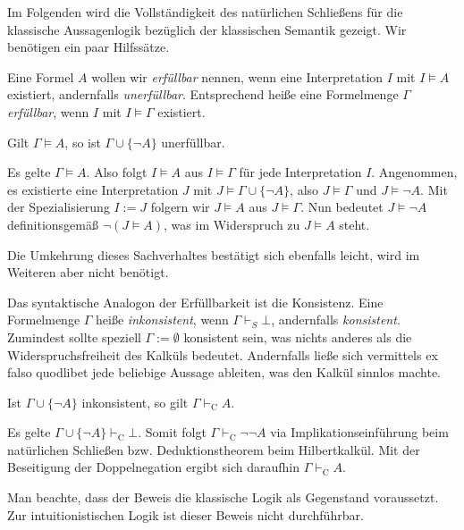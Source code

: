 Im Folgenden wird die Vollständigkeit des natürlichen Schließens für
die klassische Aussagenlogik bezüglich der klassischen Semantik gezeigt.
Wir benötigen ein paar Hilfssätze.

Eine Formel $A$ wollen wir \emph{erfüllbar} nennen, wenn eine
Interpretation $I$ mit $I\models A$ existiert, andernfalls
\emph{unerfüllbar}. Entsprechend heiße eine Formelmenge $\Gamma$
\emph{erfüllbar}, wenn $I$ mit $I\models\Gamma$ existiert.

\begin{Satz}\label{gueltig-unerf}
Gilt $\Gamma\models A$, so ist $\Gamma\cup\{\lnot A\}$ unerfüllbar.
\end{Satz}
\begin{Beweis}
Es gelte $\Gamma\models A$. Also folgt $I\models A$ aus $I\models\Gamma$
für jede Interpretation $I$. Angenommen, es existierte eine
Interpretation $J$ mit $J\models\Gamma\cup\{\lnot A\}$, also
$J\models\Gamma$ und $J\models\lnot A$. Mit der Spezialisierung $I:=J$
folgern wir $J\models A$ aus $J\models\Gamma$. Nun bedeutet
$J\models\lnot A$ definitionsgemäß $\lnot(J\models A)$, was im
Widerspruch zu $J\models A$ steht.\,\qedsymbol
\end{Beweis}

\noindent
Die Umkehrung dieses Sachverhaltes bestätigt sich ebenfalls leicht,
wird im Weiteren aber nicht benötigt.

Das syntaktische Analogon der Erfüllbarkeit ist die Konsistenz.
Eine Formelmenge $\Gamma$ heiße \emph{inkonsistent}, wenn
$\Gamma\vdash_S\bot$, andernfalls \emph{konsistent}. Zumindest sollte
speziell $\Gamma:=\emptyset$ konsistent sein, was nichts anderes als die
Widerspruchsfreiheit des Kalküls bedeutet. Andernfalls ließe sich
vermittels ex falso quodlibet jede beliebige Aussage ableiten, was den
Kalkül sinnlos machte.

\begin{Satz}\label{inkon-ableitbar}
Ist $\Gamma\cup\{\lnot A\}$ inkonsistent, so gilt $\Gamma\vdash_{\mathrm C} A$.
\end{Satz}
\begin{Beweis}
Es gelte $\Gamma\cup\{\lnot A\}\vdash_{\mathrm C}\bot$. Somit folgt
$\Gamma\vdash_{\mathrm C}\lnot\lnot A$ via Implikationseinführung beim
natürlichen Schließen bzw. Deduktionstheorem beim Hilbertkalkül. Mit der
Beseitigung der Doppelnegation ergibt sich daraufhin
$\Gamma\vdash_{\mathrm C} A$.\,\qedsymbol
\end{Beweis}

\noindent
Man beachte, dass der Beweis die klassische Logik als Gegenstand
voraussetzt. Zur intuitionistischen Logik ist dieser Beweis nicht
durchführbar.

